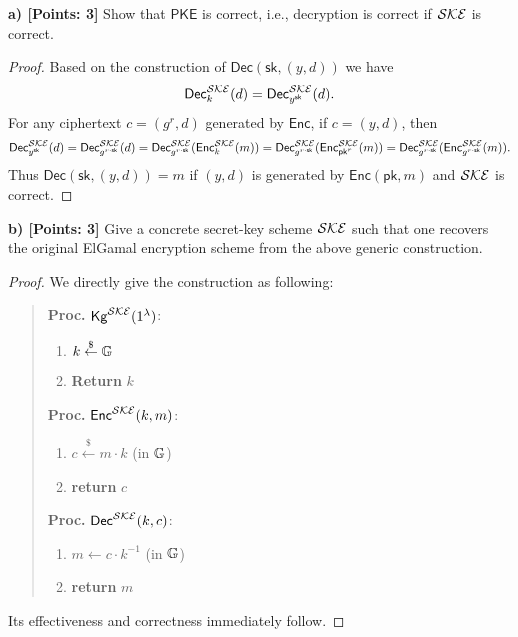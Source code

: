 \documentclass[12pt]{article}
\newcommand{\getsr}{\stackrel{\$}{\gets}}
\theoremstyle{definition}
\newcommand{\PKE}{\textsf{PKE}}
\newcommand{\Kg}{\textsf{Kg}}
\newcommand{\Enc}{\textsf{Enc}}
\newcommand{\Dec}{\textsf{Dec}}
\newcommand{\pk}{\textsf{pk}}
\newcommand{\sk}{\textsf{sk}}
\begin{document}
{\bf a) [Points: 3]} Show that $\PKE$ is correct, i.e., decryption is correct if $\mathcal{SKE}$ is correct.
\begin{proof}
Based on the construction of $\Dec(\sk,(y,d))$ we have
$$\Dec_k^\SKE(d) = \Dec_{y^{\sk}}^\SKE(d).$$
For any ciphertext $c = (g^r,d)$ generated by $\Enc$, if $c = (y,d)$, then
$$\Dec_{y^{\sk}}^\SKE(d) = \Dec_{g^{r\cdot\sk}}^\SKE(d) = \Dec_{g^{r\cdot\sk}}^\SKE(\Enc_k^\SKE(m)) = \Dec_{g^{r\cdot\sk}}^\SKE(\Enc_{\pk^r}^\SKE(m))
=\Dec_{g^{r\cdot\sk}}^\SKE(\Enc_{g^{r\cdot\sk}}^\SKE(m)).$$
Thus $\Dec(\sk,(y,d)) = m$ if $(y,d)$ is generated by $\Enc(\pk,m)$ and $\mathcal{SKE}$ is correct.
\end{proof}

{\bf b) [Points: 3]} Give a concrete secret-key scheme $\mathcal{SKE}$ such that one recovers the original ElGamal encryption scheme from the above generic construction.
\begin{proof}
We directly give the construction as following:
\begin{quote}
\begin{minipage}[t]{0.25\textwidth}
{\bf Proc.} $\Kg^\SKE(1^\lambda)$:
\begin{enumerate}
\item $k \getsr \G$
\item {\bf Return} $k$
\end{enumerate}
\end{minipage}
\begin{minipage}[t]{0.3\textwidth}
{\bf Proc.} $\Enc^\SKE(k, m)$:
\begin{enumerate}
\item $c \getsr m\cdot k$ (in $\mathbb{G}$)
\item {\bf return} $c$
\end{enumerate}
\end{minipage}
\begin{minipage}[t]{0.3\textwidth}
{\bf Proc.} $\Dec^\SKE(k, c)$:
\begin{enumerate}
\item $m \gets c\cdot k^{-1}$ (in $\mathbb{G}$)
\item {\bf return} $m$
\end{enumerate}
\end{minipage}
\end{quote}
Its effectiveness and correctness immediately follow.
\end{proof}
\end{document}
